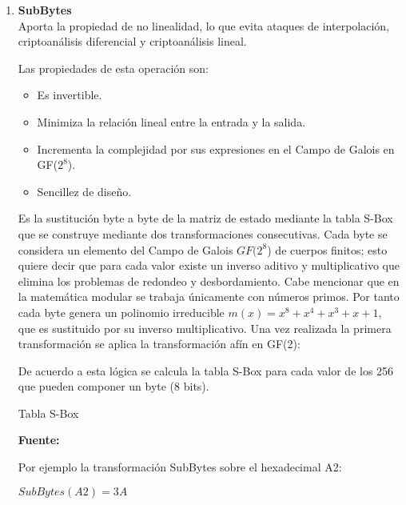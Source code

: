 \documentclass[../main/main.tex]{subfiles}
\begin{document}
      \begin{enumerate}[label=\textbf{\arabic*}.]
        \item \textbf{SubBytes} \\
          Aporta la propiedad de no linealidad, lo que evita ataques de interpolación, criptoanálisis diferencial y criptoanálisis lineal.

          Las propiedades de esta operación son:

          \begin{itemize}[noitemsep,nolistsep]
            \item Es invertible.
            \item Minimiza la relación lineal entre la entrada y la salida.
            \item Incrementa la complejidad por sus expresiones en el Campo de Galois en GF($2^8$).
            \item Sencillez de diseño.
          \end{itemize}

          Es la sustitución byte a byte de la matriz de estado mediante la tabla S-Box que se construye mediante dos transformaciones consecutivas. Cada byte se considera un elemento del Campo de Galois $GF(2^8$) de cuerpos finitos; esto quiere decir que para cada valor existe un inverso aditivo y multiplicativo que elimina los problemas de redondeo y desbordamiento. Cabe mencionar que en la matemática modular se trabaja únicamente con números primos. Por tanto cada byte genera un polinomio irreducible $m(x) = x^8 + x^4 + x^3 + x + 1$, que es sustituido por su inverso multiplicativo. Una vez realizada la primera transformación se aplica la transformación afín en GF(2):

          

          De acuerdo a esta lógica se calcula la tabla S-Box para cada valor de los 256 que pueden componer un byte (8 bits).

          \begin{table}[H]
            \scriptsize
            \centering
            \caption{Tabla S-Box}
            
            \caption*{\textbf{Fuente:} \cite{report:seguridad_europea_eeuu}}
          \end{table}

          Por ejemplo la transformación SubBytes sobre el hexadecimal A2:

          \begin{center}
            $SubBytes(A2) = 3A$
          \end{center}


\end{enumerate}
\end{document}
